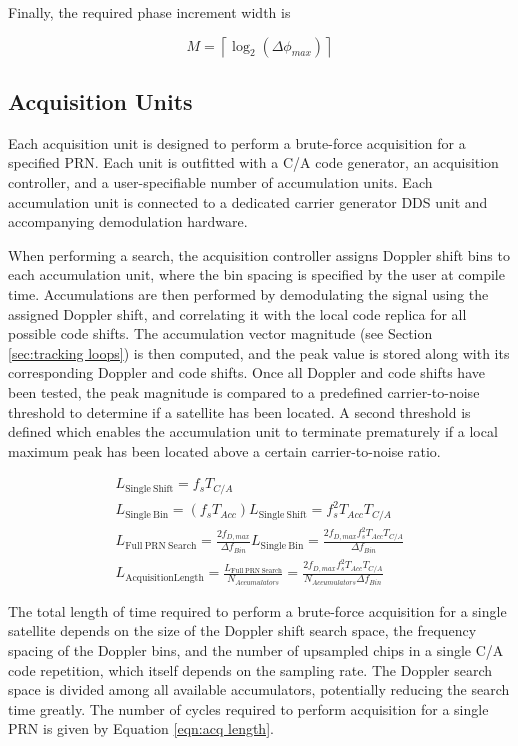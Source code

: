 \documentclass[12pt]{article}
\begin{document}
Finally, the required phase increment width is

\begin{equation*}
M = \left\lceil \log_2\left( \Delta\phi_{max} \right) \right\rceil
\end{equation*}

\subsection{Acquisition Units}
Each acquisition unit is designed to perform a brute-force acquisition for a specified PRN. Each unit is outfitted with a C/A code generator, an acquisition controller, and a user-specifiable number of accumulation units. Each accumulation unit is connected to a dedicated carrier generator DDS unit and accompanying demodulation hardware.

When performing a search, the acquisition controller assigns Doppler shift bins to each accumulation unit, where the bin spacing is specified by the user at compile time. Accumulations are then performed by demodulating the signal using the assigned Doppler shift, and correlating it with the local code replica for all possible code shifts. The accumulation vector magnitude (see Section \ref{sec:tracking loops}) is then computed, and the peak value is stored along with its corresponding Doppler and code shifts. Once all Doppler and code shifts have been tested, the peak magnitude is compared to a predefined carrier-to-noise threshold to determine if a satellite has been located. A second threshold is defined which enables the accumulation unit to terminate prematurely if a local maximum peak has been located above a certain carrier-to-noise ratio.

\begin{gather}
L_\mathrm{Single\ Shift} = f_s T_{C/A} \nonumber \\
L_\mathrm{Single\ Bin} = (f_s T_{Acc}) L_\mathrm{Single\ Shift} = f_s^2 T_{Acc} T_{C/A} \nonumber \\
L_\mathrm{Full\ PRN\ Search} = \frac{2 f_{D,max}}{\Delta f_{Bin}} L_\mathrm{Single\ Bin} = \frac{2 f_{D,max} f_s^2 T_{Acc} T_{C/A}}{\Delta f_{Bin}} \nonumber \\
\label{eqn:acq length}
L_\mathrm{Acquisition Length} = \frac{L_\mathrm{Full\ PRN\ Search}}{N_{Accumulators}} = \frac{2 f_{D,max} f_s^2 T_{Acc} T_{C/A}}{N_{Accumulators} \Delta f_{Bin}}
\end{gather}

The total length of time required to perform a brute-force acquisition for a single satellite depends on the size of the Doppler shift search space, the frequency spacing of the Doppler bins, and the number of upsampled chips in a single C/A code repetition, which itself depends on the sampling rate. The Doppler search space is divided among all available accumulators, potentially reducing the search time greatly. The number of cycles required to perform acquisition for a single PRN is given by Equation \ref{eqn:acq length}.
\end{document}
